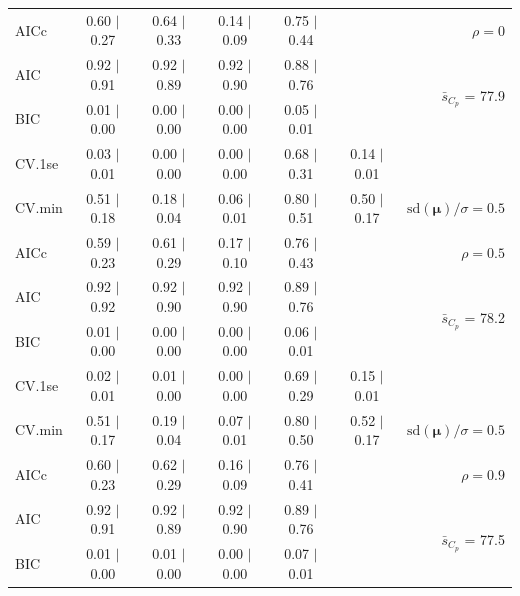 \documentclass[12pt]{article}
\newcommand{\mr}[1]{\mathrm{#1}}
\newcommand{\bm}[1]{\mathbf{#1}}
\begin{document}
\begin{table}[p]
\begin{center}
\begin{tabular}{l*{5}{c}|r}
AICc & 0.60 $\mid$ 0.27 & 0.64 $\mid$ 0.33 & 0.14 $\mid$ 0.09 & 0.75 $\mid$ 0.44 & & $\rho=0$ \\
AIC & 0.92 $\mid$ 0.91 & 0.92 $\mid$ 0.89 & 0.92 $\mid$ 0.90 & 0.88 $\mid$ 0.76 & & \multirow{2}{*}{$\bar{s}_{C_p}$ = 77.9} \\
BIC & 0.01 $\mid$ 0.00 & 0.00 $\mid$ 0.00 & 0.00 $\mid$ 0.00 & 0.05 $\mid$ 0.01 & & \\
 \hline 
CV.1se & 0.03 $\mid$ 0.01 & 0.00 $\mid$ 0.00 & 0.00 $\mid$ 0.00 & 0.68 $\mid$ 0.31 & 0.14 $\mid$ 0.01 &\\
CV.min & 0.51 $\mid$ 0.18 & 0.18 $\mid$ 0.04 & 0.06 $\mid$ 0.01 & 0.80 $\mid$ 0.51 & 0.50 $\mid$ 0.17 &  $\mr{sd}(\bm{\mu})/\sigma=0.5$ \\
AICc & 0.59 $\mid$ 0.23 & 0.61 $\mid$ 0.29 & 0.17 $\mid$ 0.10 & 0.76 $\mid$ 0.43 & & $\rho=0.5$ \\
AIC & 0.92 $\mid$ 0.92 & 0.92 $\mid$ 0.90 & 0.92 $\mid$ 0.90 & 0.89 $\mid$ 0.76 & & \multirow{2}{*}{$\bar{s}_{C_p}$ = 78.2} \\
BIC & 0.01 $\mid$ 0.00 & 0.00 $\mid$ 0.00 & 0.00 $\mid$ 0.00 & 0.06 $\mid$ 0.01 & & \\
 \hline 
CV.1se & 0.02 $\mid$ 0.01 & 0.01 $\mid$ 0.00 & 0.00 $\mid$ 0.00 & 0.69 $\mid$ 0.29 & 0.15 $\mid$ 0.01 &\\
CV.min & 0.51 $\mid$ 0.17 & 0.19 $\mid$ 0.04 & 0.07 $\mid$ 0.01 & 0.80 $\mid$ 0.50 & 0.52 $\mid$ 0.17 &  $\mr{sd}(\bm{\mu})/\sigma=0.5$ \\
AICc & 0.60 $\mid$ 0.23 & 0.62 $\mid$ 0.29 & 0.16 $\mid$ 0.09 & 0.76 $\mid$ 0.41 & & $\rho=0.9$ \\
AIC & 0.92 $\mid$ 0.91 & 0.92 $\mid$ 0.89 & 0.92 $\mid$ 0.90 & 0.89 $\mid$ 0.76 & & \multirow{2}{*}{$\bar{s}_{C_p}$ = 77.5} \\
BIC & 0.01 $\mid$ 0.00 & 0.01 $\mid$ 0.00 & 0.00 $\mid$ 0.00 & 0.07 $\mid$ 0.01 & & \\
 \hline 
 \end{tabular}
\end{center}
\vspace{-1cm}
\end{table}
\end{document}
